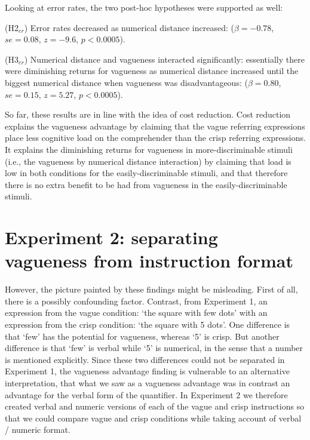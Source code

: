 \documentclass[%
man,		%
floatsintext,%
apacite%
]{apa6}
\begin{document}
Looking at error rates, the two post-hoc hypotheses were supported as well:

{\small
\begin{APAenumerate}
	\item [(H2$_{er}$)] Error rates decreased as numerical distance increased: 
	($\beta=-0.78$, $se=0.08$, $z=-9.6$, $p<0.0005$).%
	\item [(H3$_{er}$)] Numerical distance and vagueness interacted significantly: essentially there were diminishing returns for vagueness as numerical distance increased until the biggest numerical distance when vagueness was disadvantageous: 
	($\beta=0.80$, $se=0.15$, $z=5.27$, $p<0.0005$). %
\end{APAenumerate}
}

So far, these results are in line with the idea of cost reduction. Cost reduction explains the vagueness advantage by claiming that the vague referring expressions place less cognitive load on the comprehender than the crisp referring expressions. It explains the diminishing returns for vagueness in more-discriminable stimuli (i.e., the vagueness by numerical distance interaction) by claiming that load is low in both conditions for the easily-discriminable stimuli, and that therefore there is no extra benefit to be had from vagueness in the easily-discriminable stimuli.


\section{Experiment 2: separating vagueness from instruction format}


However, the picture painted by these findings might be misleading. First of all, there is a possibly confounding factor. Contrast, from Experiment 1, an expression from the vague condition: `the square with few dots' with an expression from the crisp condition: `the square with 5 dots'. 
One difference is that `few' has the potential for vagueness, whereas `5' is crisp. But
another difference is that `few' is verbal while `5' is numerical, in the sense that a number is mentioned explicitly. 
Since these two differences could not be separated in Experiment 1, the vagueness advantage finding is vulnerable to an alternative interpretation, that what we saw as a vagueness advantage was in contrast an advantage for the verbal form of the quantifier. 
In Experiment 2 we therefore created verbal and numeric versions of each of the vague and crisp instructions so that we could compare vague and crisp conditions while taking account of verbal / numeric format.
\end{document}
